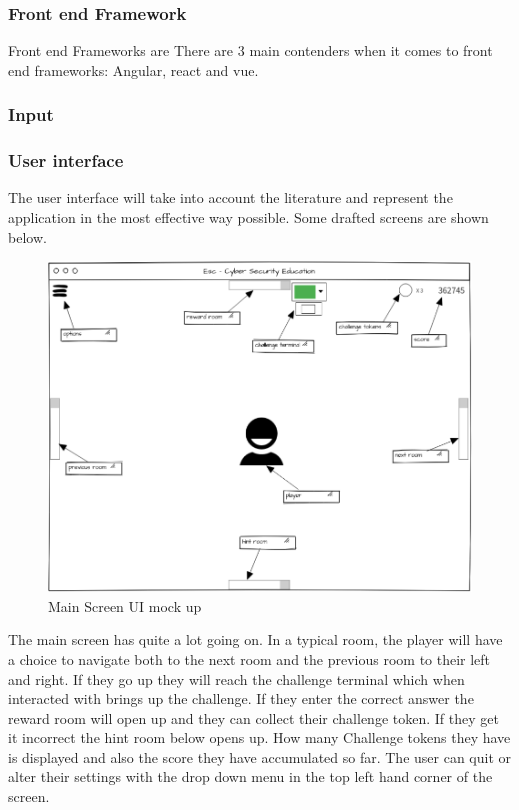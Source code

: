 \documentclass[12pt,a4paper]{article}
\begin{document}
\subsubsection{Front end Framework}  
Front end  Frameworks are  
There are 3 main contenders when it comes to front end frameworks: Angular, react and vue.  
\subsubsection{Input}
\subsubsection{User interface}  
The user interface will take into account the literature and represent the application in the most effective way possible. Some drafted screens are shown below.   

\begin{figure}[h]
    \centering
    \includegraphics[width=1.0\textwidth]{Ui_main_screen.PNG} 
    \caption{Main Screen UI mock up}
\end{figure}   

The main screen has quite a lot going on. In a typical room, the player will have a choice to navigate both to the next room and the previous room to their left and right. If they go up they will reach the challenge terminal which when interacted with brings up the challenge. If they enter the correct answer the reward room will open up and they can collect their challenge token. If they get it incorrect the hint room below opens up. How many Challenge tokens they have is displayed and also the score they have accumulated so far. The user can quit or alter their settings with the drop down menu in the top left hand corner of the screen.
\end{document}

